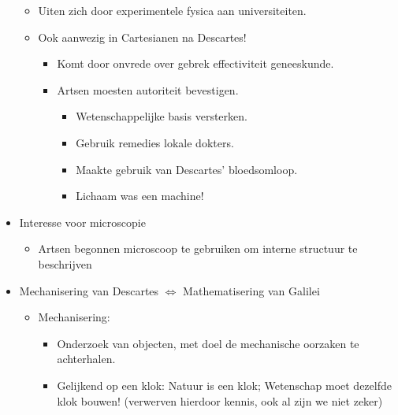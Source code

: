 \documentclass{article}
\begin{document}
\begin{itemize}
\begin{itemize}
        \item Uiten zich door experimentele fysica aan universiteiten.
        \item Ook aanwezig in Cartesianen na Descartes!
        \begin{itemize}
          \item Komt door onvrede over gebrek effectiviteit geneeskunde.
          \item Artsen moesten autoriteit bevestigen.
          \begin{itemize}
            \item Wetenschappelijke basis versterken.
            \item Gebruik remedies lokale dokters.
            \item Maakte gebruik van Descartes' bloedsomloop.
              \item Lichaam was een machine!
          \end{itemize}
        \end{itemize}
      \end{itemize}
      \item Interesse voor microscopie
      \begin{itemize}
        \item Artsen begonnen microscoop te gebruiken om interne structuur te beschrijven
      \end{itemize}
      \item Mechanisering van Descartes $\Leftrightarrow$ Mathematisering van Galilei
      \begin{itemize}
        \item Mechanisering:
        \begin{itemize}
          \item Onderzoek van objecten, met doel de mechanische oorzaken te achterhalen.
          \item Gelijkend op een klok: Natuur is een klok; Wetenschap moet dezelfde klok bouwen! (verwerven hierdoor kennis, ook al zijn we niet zeker)
        \end{itemize}
      \end{itemize}
    \end{itemize}

  \newpage
\end{document}
